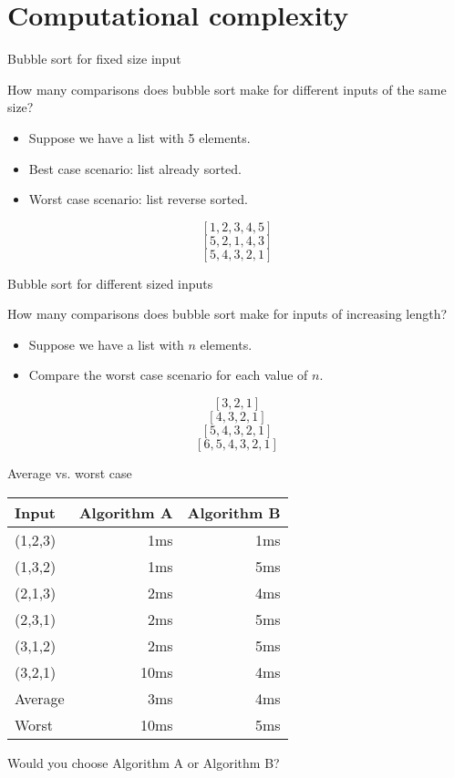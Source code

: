


\section{Computational complexity}


\begin{frame}{Bubble sort for fixed size input}
  \begin{alertblock}{How many comparisons does bubble sort make for different inputs of the same size?}
    \begin{itemize}
      \item Suppose we have a list with 5 elements.
      \item Best case scenario: list already sorted.
      \item Worst case scenario: list reverse sorted.
    \end{itemize}
    \[ [1,2,3,4,5] \]
    \[ [5,2,1,4,3] \]
    \[ [5,4,3,2,1] \]
  \end{alertblock}
\end{frame}


\begin{frame}{Bubble sort for different sized inputs}
  \begin{alertblock}{How many comparisons does bubble sort make for inputs of increasing length?}
    \begin{itemize}
      \item Suppose we have a list with $n$ elements.
      \item Compare the worst case scenario for each value of $n$.
    \end{itemize}
    \[ [3,2,1] \]
    \[ [4,3,2,1] \]
    \[ [5,4,3,2,1] \]
    \[ [6,5,4,3,2,1] \]
  \end{alertblock}
\end{frame}


\begin{frame}{Average vs. worst case}
  \begin{table}
    \begin{tabular}{p{2cm}rr}
      Input & Algorithm A & \hspace{1cm} Algorithm B \\
      \hline
      (1,2,3) &  1ms &  1ms \\
      (1,3,2) &  1ms &  5ms \\
      (2,1,3) &  2ms &  4ms \\
      (2,3,1) &  2ms &  5ms \\
      (3,1,2) &  2ms &  5ms \\
      (3,2,1) & 10ms &  4ms \\
      \hline
      Average &  3ms &  4ms \\
      Worst   & 10ms &  5ms
    \end{tabular}
  \end{table}
  \begin{center}
    Would you choose Algorithm A or Algorithm B?
  \end{center}
\end{frame}


